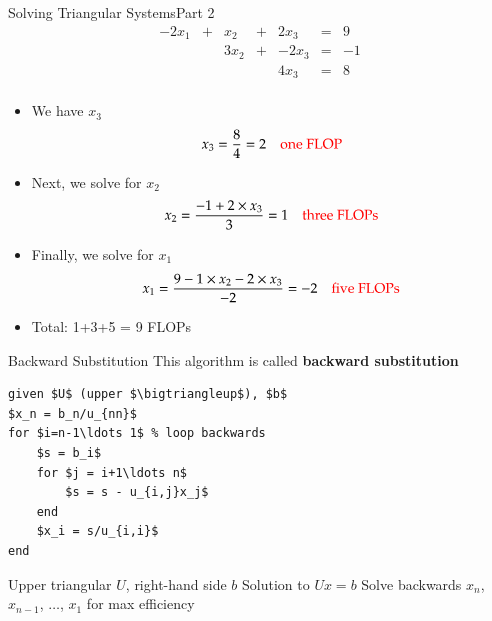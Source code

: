 \documentclass[10pt]{beamer}
\begin{document}
\begin{frame}{Solving Triangular Systems}{Part 2}
\begin{equation*}
    \begin{array}{rcrcrcr}
      -2 x_1 & + &   x_2  & + &  2x_3 &= &  9  \\
             &   &  3x_2  & + & -2x_3 &= & -1  \\
             &   &        &   &  4x_3 &= &  8  \\
    \end{array}
\end{equation*}

\begin{itemize}
    \item We have $x_3$  
    $$
          x_3 = \frac{8}{4} = 2 \quad \text{{\color{red}one FLOP}}
    $$
    \item<2-> Next, we solve for $x_2$
    $$
    x_2 = \frac{-1+2\times x_3}{3}   =1
    \quad \text{\color{red}three FLOPs}
    $$
    \item<3-> Finally, we solve for $x_1$
    $$
x_1 = \frac{9-1\times x_2-2\times x_3}{-2}
    =-2
    \quad \text{\color{red}five FLOPs}
    $$
    \item<4-> Total: 1+3+5 = {\color{red}9 FLOPs}
\end{itemize}
\end{frame}
\begin{frame}[fragile]{Backward Substitution}
This algorithm is called \textbf{backward substitution} 
\begin{lstlisting}[mathescape,label=algo:backsub]
given $U$ (upper $\bigtriangleup$), $b$               
$x_n = b_n/u_{nn}$           
for $i=n-1\ldots 1$ % loop backwards         
    $s = b_i$                  
    for $j = i+1\ldots n$    
        $s = s - u_{i,j}x_j$   
    end                      
    $x_i = s/u_{i,i}$          
end                          
\end{lstlisting}

{Upper triangular $U$, right-hand side $b$}
{Solution to $Ux=b$}
{Solve backwards $x_n$, $x_{n-1}$, $\ldots$, $x_1$ for max efficiency}
\end{frame}
\end{document}
